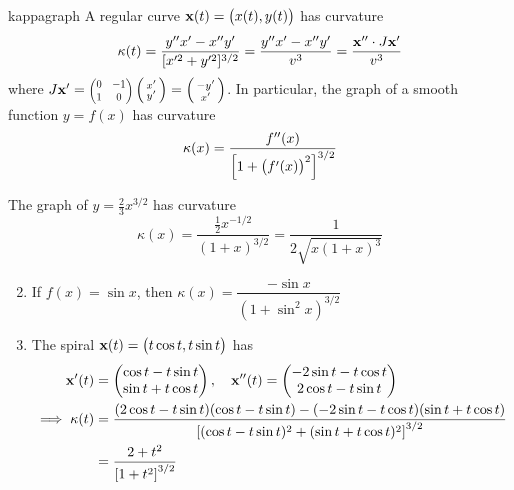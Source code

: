 \begin{cor}{}{kappagraph}
A regular curve ${\mathbf{x}}(t)=\bigl(x(t),y(t)\bigr)$ has curvature
\[\kappa(t)=\frac{y''x'-x''y'}{[x'^2+y'^2]^{3/2}} =\frac{y''x'-x''y'}{v^3} =\frac{{\mathbf{x}}''\cdot J{\mathbf{x}}'}{v^3}\]
where $J\vx'=\scalebox{0.75}{$\begin{pmatrix}
0&-1\\1&0
\end{pmatrix}$}\stwovec{x'}{y'}=\stwovec{-y'}{x'}$. In particular, the graph of a smooth function $y=f(x)$ has curvature
\[\kappa(x)=\frac{f''(x)}{\Bigl[1+\bigl(f'(x)\bigr)^2\Bigr]^{3/2}}\]
\end{cor}


\begin{examples}{}{}
\exstart The graph of $y=\frac 23x^{3/2}$ has curvature
\[\kappa(x)=\frac{\frac 12x^{-1/2}}{(1+x)^{3/2}}= \frac 1{2\sqrt{x(1+x)^3}}\]
\begin{enumerate}\setcounter{enumi}{1}
  \item If $f(x)=\sin x$, then $\kappa(x)=\dfrac{-\sin x}{(1+\sin^2\!x)^{3/2}}$
  \item The spiral ${\mathbf{x}}(t)=\bigl(t\cos t,t\sin t\bigr)$ has
  \begin{align*}
  {\mathbf{x}}'(t)&=\begin{pmatrix}\cos t-t\sin t\\\sin t+t\cos t\end{pmatrix},\quad {\mathbf{x}}''(t)=\begin{pmatrix}-2\sin t-t\cos t\\2\cos t-t\sin t\end{pmatrix}\\
  \implies \kappa(t)&=\frac{(2\cos t-t\sin t)(\cos t-t\sin t)-(-2\sin t-t\cos t)(\sin t+t\cos t)}{\left[(\cos t-t\sin t)^2+(\sin t+t\cos t)^2\right]^{3/2}}\\
  &=\frac{2+t^2}{\left[1+t^2\right]^{3/2}}
  \end{align*}
\end{enumerate}

\end{examples}

\clearpage

